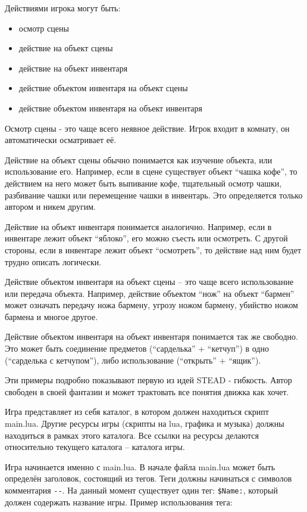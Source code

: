 \documentclass[a4paper,12pt]{article}
\begin{document}
Действиями игрока могут быть:

\begin{itemize}
\item {осмотр сцены}
\item {действие на объект сцены}
\item {действие на объект инвентаря}
\item {действие объектом инвентаря на объект сцены}
\item {действие объектом инвентаря на объект инвентаря}
\end{itemize}

Осмотр сцены - это чаще всего неявное действие. Игрок входит в комнату, он автоматически осматривает её.

Действие на объект сцены обычно понимается как изучение объекта, или использование его. Например, если в сцене существует объект ``чашка кофе'', то действием на него может быть выпивание кофе, тщательный осмотр чашки, разбивание чашки или перемещение чашки в инвентарь. Это определяется только автором и никем другим.

Действие на объект инвентаря понимается аналогично. Например, если в инвентаре лежит объект ``яблоко'', его можно съесть или осмотреть. С другой стороны, если в инвентаре лежит объект ``осмотреть'', то действие над ним будет трудно описать логически.

Действие объектом инвентаря на объект сцены -- это чаще всего использование или передача объекта. Например, действие объектом ``нож'' на объект ``бармен'' может означать передачу ножа бармену, угрозу ножом бармену, убийство ножом бармена и многое другое.

Действие объектом инвентаря на объект инвентаря понимается так же свободно. Это может быть соединение предметов (``сарделька'' + ``кетчуп'') в одно (``сарделька с кетчупом''), либо использование (``открыть'' + ``ящик'').

Эти примеры подробно показывают первую из идей STEAD - гибкость. Автор свободен в своей фантазии и может трактовать все понятия движка как хочет.

Игра представляет из себя каталог, в котором должен находиться скрипт main.lua. Другие ресурсы игры (скрипты на lua, графика и музыка) должны находиться в рамках этого каталога. Все ссылки на ресурсы делаются относительно текущего каталога -- каталога игры.

Игра начинается именно с main.lua. В начале файла main.lua может быть определён заголовок, состоящий из тегов. Теги должны начинаться с символов комментария \verb/--/. На данный момент существует один тег: \verb/$Name:/, который должен содержать название игры. Пример использования тега:
\end{document}
